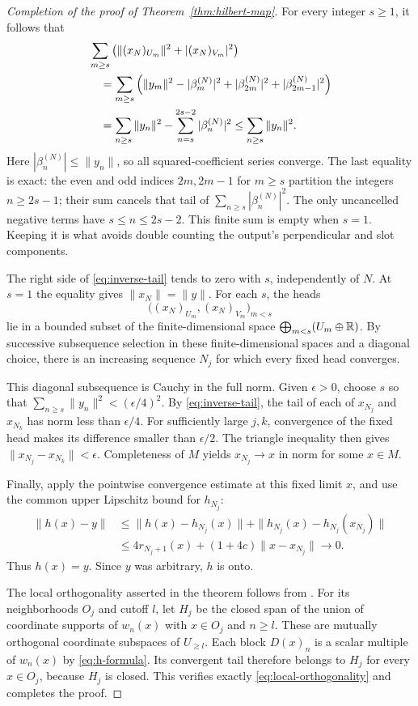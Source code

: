 \begin{proof}[Completion of the proof of Theorem~\ref{thm:hilbert-map}]
For every integer \(s\ge1\), it follows that
\begin{align}
\label{eq:inverse-tail}
 &\sum_{m\ge s}
   \left(\|(x_N)_{U_m}\|^2+|(x_N)_{V_m}|^2\right)\notag\\
 &\quad=\sum_{m\ge s}
   \left(\|y_m\|^2-|\beta_m^{(N)}|^2
               +|\beta_{2m}^{(N)}|^2
               +|\beta_{2m-1}^{(N)}|^2\right)\notag\\
 &\quad=\sum_{n\ge s}\|y_n\|^2
                -\sum_{n=s}^{2s-2}|\beta_n^{(N)}|^2
 \le\sum_{n\ge s}\|y_n\|^2.
\end{align}
Here \(|\beta_n^{(N)}|\le\|y_n\|\), so all squared-coefficient
series converge. The last equality is exact: the even and odd
indices \(2m,2m-1\) for \(m\ge s\) partition the integers
\(n\ge2s-1\); their sum cancels that tail of
\(\sum_{n\ge s}|\beta_n^{(N)}|^2\). The only uncancelled negative
terms have \(s\le n\le2s-2\). This finite sum is empty when \(s=1\).
Keeping it is what avoids double counting the output's perpendicular
and slot components.

The right side of \eqref{eq:inverse-tail} tends to zero with \(s\),
independently of \(N\). At \(s=1\) the equality gives
\(\|x_N\|=\|y\|\). For each \(s\), the heads
\[
 \bigl((x_N)_{U_m},(x_N)_{V_m}\bigr)_{m<s}
\]
lie in a bounded subset of the finite-dimensional space
\(\bigoplus_{m<s}(U_m\oplus\mathbb R)\). By successive subsequence
selection in these finite-dimensional spaces and a diagonal choice,
there is an increasing sequence \(N_j\) for which every fixed head
converges.

This diagonal subsequence is Cauchy in the full norm. Given
\(\epsilon>0\), choose \(s\) so that
\(\sum_{n\ge s}\|y_n\|^2<(\epsilon/4)^2\). By
\eqref{eq:inverse-tail}, the tail of each of \(x_{N_j}\) and
\(x_{N_k}\) has norm less than \(\epsilon/4\).
For sufficiently large \(j,k\), convergence of the fixed head makes
its difference smaller than \(\epsilon/2\). The triangle inequality
then gives \(\|x_{N_j}-x_{N_k}\|<\epsilon\).
Completeness of \(M\) yields \(x_{N_j}\to x\) in norm for some
\(x\in M\).

Finally, apply the pointwise convergence estimate at this fixed
limit \(x\), and use the common upper Lipschitz bound for \(h_{N_j}\):
\begin{align*}
 \|h(x)-y\|
 &\le\|h(x)-h_{N_j}(x)\|
      +\|h_{N_j}(x)-h_{N_j}(x_{N_j})\|\\
 &\le4r_{N_j+1}(x)+(1+4c)\|x-x_{N_j}\|\longrightarrow0.
\end{align*}
Thus \(h(x)=y\). Since \(y\) was arbitrary, \(h\) is onto.

The local orthogonality asserted in the theorem follows from
. For its neighborhoods $O_j$ and cutoff $l$,
let $H_j$ be the closed span of the union of coordinate supports of
$w_n(x)$ with $x\in O_j$ and $n\ge l$. These are mutually orthogonal
coordinate subspaces of $U_{\ge l}$. Each block $D(x)_n$ is a scalar
multiple of $w_n(x)$ by \eqref{eq:h-formula}. Its convergent tail
therefore belongs to $H_j$ for every $x\in O_j$, because $H_j$ is closed.
This verifies exactly \eqref{eq:local-orthogonality} and completes the proof.
\end{proof}
